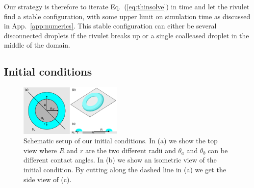 \documentclass[twoside,twocolumn,9pt]{article}
\begin{document}
Our strategy is therefore to iterate Eq.~(\ref{eq:thinsolve}) in time and let the rivulet find a stable configuration, with some upper limit on simulation time as discussed in App.~\ref{app:numerics}.
This stable configuration can either be several disconnected droplets if the rivulet breaks up or a single coalleased droplet in the middle of the domain.  

\subsection{Initial conditions}
\begin{figure}
\centering
  \includegraphics[width=0.45\textwidth]{ringrivulet_shema}
  \caption{Schematic setup of our initial conditions. In (a) we show the top view where $R$ and $r$ are the two different radii and $\theta_a$ and $\theta_b$ can be different contact angles. 
  In (b) we show an isometric view of the initial condition.
  By cutting along the dashed line in (a) we get the side view of (c).}
  \label{fig:ringschema}
\end{figure}
\end{document}
